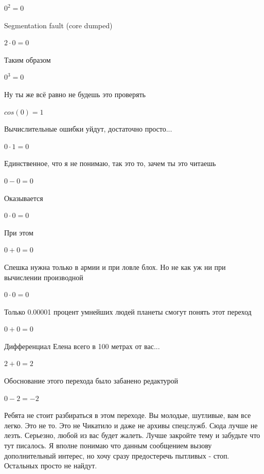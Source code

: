 \documentclass[12pt,a4paper,fleqn]{article}
\begin{document}
\begin{center}$0^{2} = 0$\end{center}
Segmentation fault (core dumped)

\begin{center}$2 \cdot 0 = 0$\end{center}
Таким образом

\begin{center}$0^{3} = 0$\end{center}
Ну ты же всё равно не будешь это проверять

\begin{center}$cos(0) = 1$\end{center}
Вычислительные ошибки уйдут, достаточно просто...

\begin{center}$0 \cdot 1 = 0$\end{center}
Единственное, что я не понимаю, так это то, зачем ты это читаешь

\begin{center}$0-0 = 0$\end{center}
Оказывается

\begin{center}$0 \cdot 0 = 0$\end{center}
При этом

\begin{center}$0+0 = 0$\end{center}
Спешка нужна только в армии и при ловле блох. Но не как уж ни при вычислении производной\cite{link2}

\begin{center}$0 \cdot 0 = 0$\end{center}
Только 0.00001 процент умнейших людей планеты смогут понять этот переход

\begin{center}$0+0 = 0$\end{center}
Дифференциал Елена всего в 100 метрах от вас...

\begin{center}$2+0 = 2$\end{center}
Обоснование этого перехода было забанено редактурой

\begin{center}$0-2 = -2$\end{center}
Ребята не стоит разбираться в этом переходе. Вы молодые, шутливые, вам все легко. Это не то. Это не Чикатило и даже не архивы спецслужб. Сюда лучше не лезть. Серьезно, любой из вас будет жалеть. Лучше закройте тему и забудьте что тут писалось. Я вполне понимаю что данным сообщением вызову дополнительный интерес, но хочу сразу предостеречь пытливых - стоп. Остальных просто не найдут.
\end{document}
